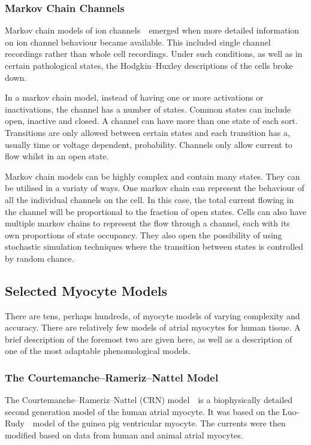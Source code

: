 \subsubsection{Markov Chain Channels}

Markov chain models of ion channels~\cite{Balser1990,Clancy1999,Silva2005}\
emerged when more detailed information on ion channel behaviour became
available.
This included single channel recordings rather than whole cell recordings.
Under such conditions, as well as in certain pathological states, the
Hodgkin--Huxley descriptions of the cells broke down.

In a markov chain model, instead of having one or more activations or
inactivations, the channel has a number of states.
Common states can include open, inactive and closed.
A channel can have more than one state of each sort.
Transitions are only allowed between certain states and each transition has a,
usually time or voltage dependent, probability.
Channels only allow current to flow whilst in an open state.

Markov chain models can be highly complex and contain many states.
They can be utilised in a variaty of ways.
One markov chain can represent the behaviour of all the individual channels on
the cell.
In this case, the total current flowing in the channel will be proportional to
the fraction of open states.
Cells can also have multiple markov chains to represent the flow through a
channel, each with its own proportions of state occupancy.
They also open the possibility of using stochastic simulation techniques where
the transition between states is controlled by random chance.

\subsection{Selected Myocyte Models}

There are tens, perhaps hundreds, of myocyte models of varying complexity and
accuracy.
There are relatively few models of atrial myocytes for human tissue.
A brief description of the foremost two are given here, as well as a description
of one of the most adaptable phenomological models.

\subsubsection{The Courtemanche--Rameriz--Nattel Model}

The Courtemanche--Rameriz--Nattel (CRN) model~\cite{CRN1998}\ is a biophysically
detailed second generation model of the human atrial myocyte.
It was based on the Luo-Rudy~\cite{LR1994}\ model of the guinea pig ventricular
myocyte.
The currents were then modified based on data from human and animal atrial
myocytes.

